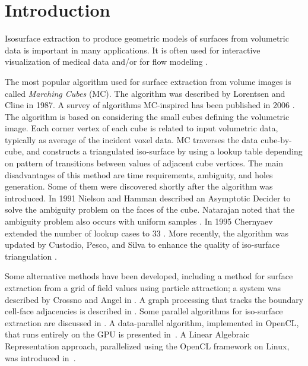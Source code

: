 \section{Introduction}\label{sec:intro}


Isosurface extraction to produce geometric models of surfaces from volumetric data is important in many applications. It is often used for interactive visualization of medical data and/or for flow modeling \cite{Rohan2018a}. 
 
The most popular algorithm used for surface extraction from volume images is called \emph{Marching Cubes} (MC). The algorithm was described by Lorentsen and Cline \cite{Lorensen1987} in 1987. A survey of algorithms MC-inspired has been published in 2006 \cite{Newman2006}. The algorithm is based on considering the small cubes defining the volumetric image. Each corner vertex of each cube is related to input volumetric data, typically as average of the incident voxel data. MC traverses the data cube-by-cube, and constructs a triangulated iso-surface by using a lookup table depending on pattern of transitions between values of adjacent cube vertices.   The main disadvantages of this method are time requirements, ambiguity, and holes generation. Some of them were discovered shortly after the algorithm was introduced. 
In 1991 Nielson and Hamman described an Asymptotic Decider to solve the ambiguity problem on the faces of the cube.  Natarajan noted that the ambiguity problem also occurs with uniform samples \cite{Natarajan1994}. In 1995 Chernyaev extended the number of lookup  cases to 33 \cite{chernyaev1995marching}. More recently, the algorithm was updated by Custodio, Pesco, and Silva to enhance the quality of iso-surface triangulation \cite{Custodio2019}. 

Some alternative methods have been developed, including a method for surface extraction from a grid of field values using particle attraction; a system was described by Crossno and Angel in \cite{Crossno1997}. A graph processing that tracks the boundary cell-face adjacencies is described in \cite{Lachaud2000}. Some parallel algorithms for iso-surface extraction are discussed in \cite{Bajaj2004}.
A data-parallel algorithm, implemented in OpenCL, that runs entirely on the GPU is presented in~\cite{Smistad12}. 
A Linear Algebraic Representation approach, parallelized using the OpenCL framework on Linux, was introduced in~\cite{Paoluzzi2016}. %

